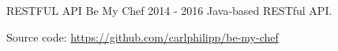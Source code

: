 \begin{cventries}
  \vspace{-2.0mm}
  \projectentry
  	{RESTFUL API} %
  	{Be My Chef} %
  	{2014 - 2016} %
    {Java-based RESTful API.\linebreak
{}
    }
    {
    \begin{projectdetails}
        	\item Source code: \href{https://github.com/carlphilipp/be-my-chef}{https://github.com/carlphilipp/be-my-chef}
      \end{projectdetails}
    }

\end{cventries}
\vspace{-2.0mm}
